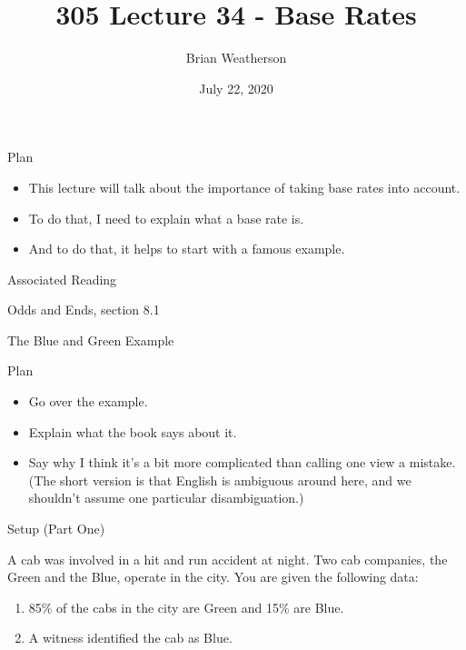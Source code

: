 \documentclass[
  ignorenonframetext,
]{beamer}
\title{305 Lecture 34 - Base Rates}
\author{Brian Weatherson}
\date{July 22, 2020}
\providecommand{\tightlist}{%
  \setlength{\itemsep}{0pt}\setlength{\parskip}{0pt}}
\renewcommand{\,}{\text{, }}
\begin{document}
\frame{\titlepage}

\begin{frame}{Plan}
\protect\hypertarget{plan}{}

\begin{itemize}
\tightlist
\item
  This lecture will talk about the importance of taking base rates into
  account.
\item
  To do that, I need to explain what a base rate is.
\item
  And to do that, it helps to start with a famous example.
\end{itemize}

\end{frame}

\begin{frame}{Associated Reading}
\protect\hypertarget{associated-reading}{}

Odds and Ends, section 8.1

\end{frame}

\begin{frame}{The Blue and Green Example}
\protect\hypertarget{the-blue-and-green-example}{}

Plan

\begin{itemize}
\tightlist
\item
  Go over the example.
\item
  Explain what the book says about it.
\item
  Say why I think it's a bit more complicated than calling one view a
  mistake. (The short version is that English is ambiguous around here,
  and we shouldn't assume one particular disambiguation.)
\end{itemize}

\end{frame}

\begin{frame}{Setup (Part One)}
\protect\hypertarget{setup-part-one}{}

A cab was involved in a hit and run accident at night. Two cab
companies, the Green and the Blue, operate in the city. You are given
the following data:

\begin{enumerate}
\tightlist
\item
  85\% of the cabs in the city are Green and 15\% are Blue.
\item
  A witness identified the cab as Blue.
\end{enumerate}

\end{frame}
\end{document}
